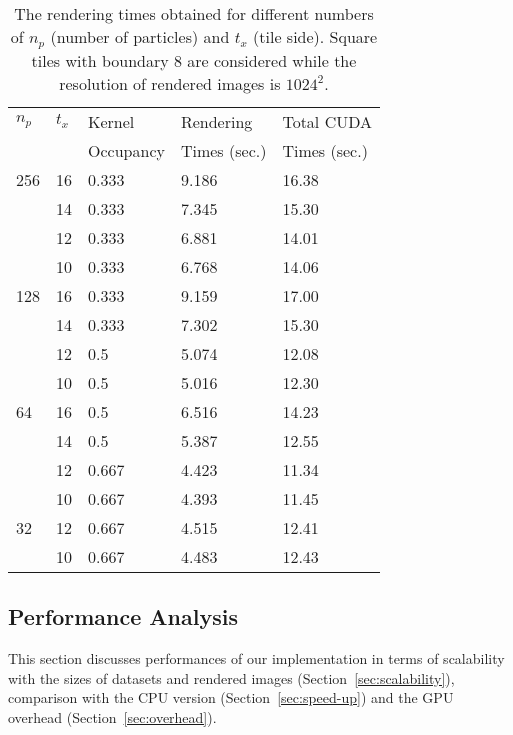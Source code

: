 \documentclass[1p]{elsarticle}
\begin{document}
\begin{table}
\label{tab:tuning}
\begin{center}
\begin{tabular}{|l|l|l|l|l|}
\hline
$n_p$ & $t_x$ & Kernel & Rendering & Total CUDA \\
& & Occupancy & Times (sec.) & Times (sec.) \\
\hline
256   & 16 & 0.333 & 9.186 & 16.38 \\
\hline
      & 14 & 0.333 & 7.345  & 15.30 \\
\hline
      & 12 & 0.333 & 6.881  & 14.01 \\
\hline
      & 10 & 0.333 & 6.768 & 14.06 \\
\hline
128   & 16 & 0.333 & 9.159 & 17.00 \\
\hline
      & 14 & 0.333 & 7.302  & 15.30 \\
\hline
      & 12 & 0.5 & 5.074  & 12.08 \\
\hline
      & 10 & 0.5 & 5.016 & 12.30 \\ 
\hline
64    & 16 & 0.5 & 6.516 & 14.23 \\
\hline
      & 14 & 0.5 & 5.387 & 12.55 \\
\hline
      & 12 & 0.667 & 4.423 & 11.34 \\
\hline
      & 10 & 0.667 & 4.393 & 11.45 \\ 
\hline
32    & 12 & 0.667 & 4.515 & 12.41 \\
\hline
      & 10 & 0.667 & 4.483 & 12.43 \\ 
\hline
\end{tabular}
\caption{The rendering times obtained for different numbers of $n_p$ (number of particles) and $t_x$ (tile side). Square tiles with boundary 8 are considered while the resolution of rendered images is $1024^{2}.$}
\end{center}
\end{table}

\subsection{Performance Analysis}
\label{sec:performance}
This section discusses performances of our implementation in terms of scalability with the sizes of datasets and rendered images (Section~\ref{sec:scalability}), comparison with the CPU version (Section~\ref{sec:speed-up}) and the GPU overhead (Section~\ref{sec:overhead}).
\end{document}
